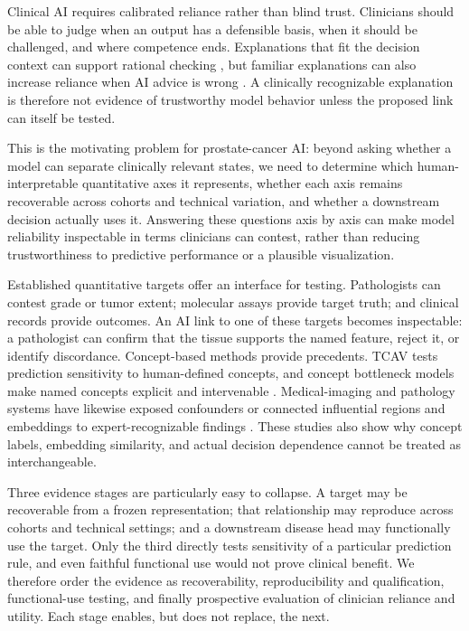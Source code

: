 Clinical AI requires calibrated reliance rather than blind trust. Clinicians should be able to
judge when an output has a defensible basis, when it should be challenged, and where competence
ends. Explanations that fit the decision context can support rational
checking \cite{tonekaboni2019}, but familiar explanations can also increase reliance when AI
advice is wrong \cite{prinster2024}. A clinically recognizable explanation is therefore not
evidence of trustworthy model behavior unless the proposed link can itself be tested.

This is the motivating problem for prostate-cancer AI: beyond asking whether a model can
separate clinically relevant states, we need to determine which human-interpretable
quantitative axes it represents, whether each axis remains recoverable across cohorts and
technical variation, and whether a downstream decision actually uses it. Answering these
questions axis by axis can make model reliability inspectable in terms clinicians can contest,
rather than reducing trustworthiness to predictive performance or a plausible visualization.

Established quantitative targets offer an interface for testing. Pathologists can contest grade
or tumor extent; molecular assays provide target truth; and clinical records provide outcomes.
An AI link to one of these targets becomes inspectable: a pathologist can confirm that the tissue supports the named feature,
reject it, or identify discordance. Concept-based
methods provide precedents. TCAV tests prediction sensitivity to human-defined concepts, and
concept bottleneck models make named concepts explicit and intervenable
\cite{kim2018,koh2020}. Medical-imaging and pathology systems have likewise exposed
confounders or connected influential regions and embeddings to expert-recognizable findings
\cite{sauter2022,lou2026,han2026}. These studies also show why concept labels, embedding
similarity, and actual decision dependence cannot be treated as interchangeable.

Three evidence stages are particularly easy to collapse. A target may be recoverable from a
frozen representation; that relationship may reproduce across cohorts and technical
settings; and a downstream disease head may functionally use the target. Only the third
directly tests sensitivity of a particular prediction rule, and even faithful functional use
would not prove clinical benefit. We therefore order the evidence as recoverability,
reproducibility and qualification, functional-use testing, and finally prospective evaluation
of clinician reliance and utility. Each stage enables, but does not replace, the next.

